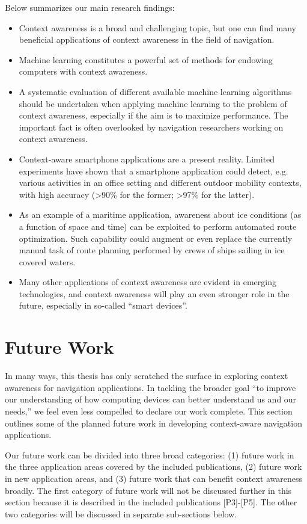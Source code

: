 Below summarizes our main research findings:
%
\begin{itemize}
\item Context awareness is a broad and challenging topic, but one can find many beneficial applications of context awareness in the field of navigation.
\item Machine learning constitutes a powerful set of methods for endowing computers with context awareness.
\item A systematic evaluation of different available machine learning algorithms should be undertaken when applying machine learning to the problem of context awareness, especially if the aim is to maximize performance. The important fact is often overlooked by navigation researchers working on context awareness.
\item Context-aware smartphone applications are a present reality. Limited experiments have shown that a smartphone application could detect, e.g. various activities in an office setting and different outdoor mobility contexts, with high accuracy (\textgreater90\% for the former; \textgreater97\% for the latter).
\item As an example of a maritime application, awareness about ice conditions (as a function of space and time) can be exploited to perform automated route optimization. Such capability could augment or even replace the currently manual task of route planning performed by crews of ships sailing in ice covered waters.
\item Many other applications of context awareness are evident in emerging technologies, and context awareness will play an even stronger role in the future, especially in so-called ``smart devices''.

\end{itemize}

\section{Future Work}
\label{sec:future_work}

In many ways, this thesis has only scratched the surface in exploring context awareness for navigation applications. In tackling the broader goal ``to improve our understanding of how computing devices can better understand us and our needs,'' we feel even less compelled to declare our work complete. This section outlines some of the planned future work in developing context-aware navigation applications.

Our future work can be divided into three broad categories: (1) future work in the three application areas covered by the included publications, (2) future work in new application areas, and (3) future work that can benefit context awareness broadly. The first category of future work will not be discussed further in this section because it is described in the included publications [P3]-[P5]. The other two categories will be discussed in separate sub-sections below.

